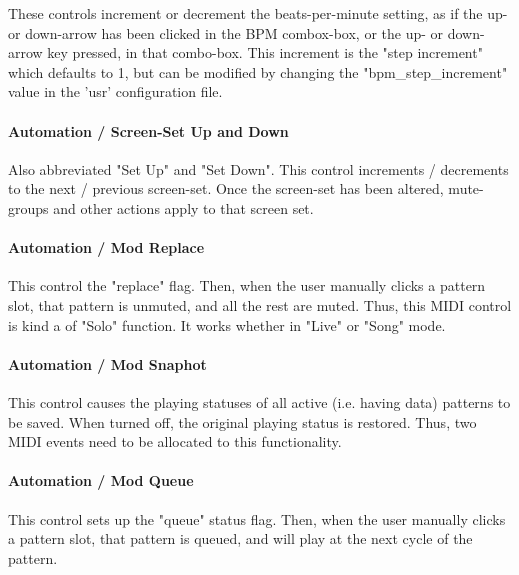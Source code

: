    These controls increment or decrement the beats-per-minute setting, as if
   the up- or down-arrow has been clicked in the BPM combox-box, or the up- or
   down-arrow key pressed, in that combo-box.
   This increment is the
   "step increment" which defaults to 1, but can be modified by
   changing the "bpm\_step\_increment" value in the 'usr'
   configuration file.

\paragraph{Automation / Screen-Set Up and Down}
\label{paragraph:configuration_midi_ctrl_ssupdn}

   Also abbreviated "Set Up" and "Set Down".
   This control increments / decrements to the next / previous screen-set. 
   Once the screen-set has been altered, mute-groups and other
   actions apply to that screen set.

\paragraph{Automation / Mod Replace}
\label{paragraph:configuration_midi_ctrl_modrep}

   This control the "replace" flag.
   Then, when the user manually clicks a pattern slot,
   that pattern is unmuted, and all the rest are muted.
   Thus, this MIDI control is kind a of "Solo" function.
   It works whether in "Live" or "Song" mode.

\paragraph{Automation / Mod Snaphot}
\label{paragraph:configuration_midi_ctrl_modsnap}

   This control causes the playing statuses of all active
   (i.e. having data) patterns to be saved.  When turned off, the
   original playing status is restored.  Thus, two MIDI events
   need to be allocated to this functionality.

\paragraph{Automation / Mod Queue}
\label{paragraph:configuration_midi_ctrl_modqueue}

   This control sets up the "queue" status flag.
   Then, when the user manually clicks a pattern slot,
   that pattern is queued, and will play at the next cycle of the
   pattern.

